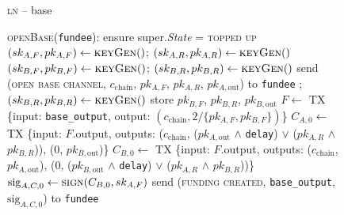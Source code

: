 \begin{figure}[H]
  \begin{processbox}{\textsc{ln} -- base}
    \begin{algorithmic}[1]
      \State \textsc{openBase}(\texttt{fundee}):
      \Indent
        \State ensure super.\textit{State} = \textsc{topped up}
        \State $(sk_{A, F}, pk_{A, F}) \gets \textsc{keyGen}()$;
        $(sk_{A, R}, pk_{A, R}) \gets \textsc{keyGen}()$
          \State $(sk_{B, F}, pk_{B, F}) \gets \textsc{keyGen}()$; $(sk_{B, R},
          pk_{B, R}) \gets \textsc{keyGen}()$
        \Else \: 
          \State send (\textsc{open base channel}, $c_{\mathrm{chain}}$, $pk_{A,
          F}$, $pk_{A, R}$, $pk_{A, \mathrm{out}}$) to \texttt{fundee}
          \State {}
          \State {}
          \State {}
          \State {};
          $(sk_{B, R}, pk_{B, R}) \gets \textsc{keyGen}()$
          \State {}
          \State store $pk_{B, F}$, $pk_{B, R}$, $pk_{B, \mathrm{out}}$
        \EndIf
        \State $F \gets$ TX \{input: \texttt{base\_output}, output:
        $(c_{\mathrm{chain}}, 2/\{pk_{A, F}, pk_{B, F}\})$\}
        \label{code:ln:base:create-funding}
          \State $C_{A, 0} \gets$ TX \{input: $F$.output, outputs:
          ($c_{\mathrm{chain}}$, ($pk_{A, \mathrm{out}}$ $\wedge$
          \texttt{delay}) $\vee$ ($pk_{A, R}$ $\wedge$ $pk_{B, R}$)), ($0$,
          $pk_{B, \mathrm{out}}$)\}
          \State $C_{B, 0} \gets$ TX \{input: $F$.output, outputs:
          ($c_{\mathrm{chain}}$, $pk_{A, \mathrm{out}}$), ($0$, ($pk_{B,
          \mathrm{out}}$ $\wedge$ \texttt{delay}) $\vee$ ($pk_{A, R}$ $\wedge$
          $pk_{B, R}$))\}
          \State $\mathrm{sig}_{A, C, 0} \gets \textsc{sign}(C_{B, 0}, sk_{A,
          F})$
          \State send (\textsc{funding created}, \texttt{base\_output},
          $\mathrm{sig}_{A, C, 0}$) to \texttt{fundee}
          \State {}
          \State {}

\end{algorithmic}
\end{processbox}
\end{figure}
